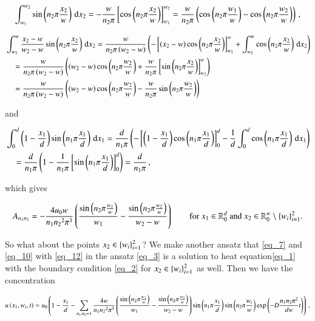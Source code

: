 \documentclass[11pt,english,a4paper]{article}
\begin{document}
\begin{flushleft}
\begin{align*}
\int_{w_1}^{w_2}\sin\left({n_2\pi\frac{x_2}{w}}\right)\,\mathrm{d}x_2 = -\frac{w}{n_2 \pi}\left[{\cos\left({n_2\pi\frac{x_2}{w}}\right)}\right]_{w_1}^{w_2} = \frac{w}{n_2 \pi}\left({\cos\left({n_2\pi\frac{w_1}{w}}\right) - \cos\left({n_2\pi\frac{w_2}{w}}\right)}\right)\,,
\end{align*}

\begin{align*}
&\int_{w_2}^{w}\frac{x_2-w}{w_2-w}\sin\left({n_2\pi\frac{x_2}{w}}\right)\,\mathrm{d}x_2 = \frac{w}{n_2 \pi\left({w_2-w}\right)}\left({-\left[{\left({x_2-w}\right)\cos\left({n_2\pi\frac{x_2}{w}}\right)}\right]_{w_2}^w + \int_{w_2}^w \cos\left({n_2\pi\frac{x_2}{w}}\right)\,\mathrm{d}x_2}\right)
\\
&\quad = \frac{w}{n_2 \pi\left({w_2-w}\right)}\left({\left({w_2-w}\right)\cos\left({n_2\pi\frac{w_2}{w}}\right) + \frac{w}{n_2 \pi}\left[{ \sin\left({n_2\pi\frac{x_2}{w}}\right)}\right]_{w_2}^w}\right)
\\
&\quad = \frac{w}{n_2 \pi\left({w_2-w}\right)}\left({\left({w_2-w}\right)\cos\left({n_2\pi\frac{w_2}{w}}\right) - \frac{w}{n_2 \pi} \sin\left({n_2\pi\frac{w_2}{w}}\right)}\right)
\end{align*}

and

\begin{align*}
&\int_{0}^{d}\left({1-\frac{x_1}{d}}\right)\sin\left({n_1\pi\frac{x_1}{d}}\right)\,\mathrm{d}x_1 = \frac{d}{n_1\pi}\left({-\left[{\left({1-\frac{x_1}{d}}\right)\cos\left({n_1\pi\frac{x_1}{d}}\right)}\right]_0^d - \frac{1}{d}\int_{0}^{d}\cos\left({n_1\pi\frac{x_1}{d}}\right)\,\mathrm{d}x_1}\right)
\\
&\quad = \frac{d}{n_1\pi}\left({1 - \frac{1}{n_1 \pi}\left[{\sin\left({n_1\pi\frac{x_1}{d}}\right)}\right]_0^d}\right) = \frac{d}{n_1 \pi}\,,
\end{align*}

which gives

\begin{align}
A_{n_1 n_2} = -\frac{4 u_0 w}{n_1 {n_2}^2 \pi^3}\left({\frac{\sin\left({n_2 \pi \frac{w_1}{w}}\right)}{w_1}-\frac{\sin\left({n_2 \pi \frac{w_2}{w}}\right)}{w_2-w}}\right) \qquad \text{for $x_1\in\mathbb{R}_0^d$ and $x_2\in\mathbb{R}_0^w \setminus \left\lbrace{w_i}\right\rbrace_{i=1}^2$.}
\label{eq_12}
\end{align}

So what about the points $x_2\in\left\lbrace{w_i}\right\rbrace_{i=1}^2$? We make another ansatz that \eqref{eq_7} and \eqref{eq_10} with \eqref{eq_12} in the ansatz \eqref{eq_3} is a solution to heat equation\eqref{eq_1} with the boundary condition \eqref{eq_2} for $x_2\in\left\lbrace{w_i}\right\rbrace_{i=1}^2$ as well. Then we have the concentration

\begin{align*}
u\left({x_1,w_i,t}\right) = u_0\left({1-\frac{x_1}{d} - \sum_{n_1,n_2=1} \frac{4 w}{n_1 {n_2}^2 \pi^3}\left({\frac{\sin\left({n_2 \pi \frac{w_1}{w}}\right)}{w_1}-\frac{\sin\left({n_2 \pi \frac{w_2}{w}}\right)}{w_2-w}}\right)\sin\left({n_1\pi \frac{x_1}{d}}\right) \sin\left({n_2\pi \frac{w_i}{w}}\right) \exp\left({-D\frac{n_1 n_2 \pi^2}{dw} t}\right)}\right)\,,
\end{align*}


\end{flushleft}
\end{document}
